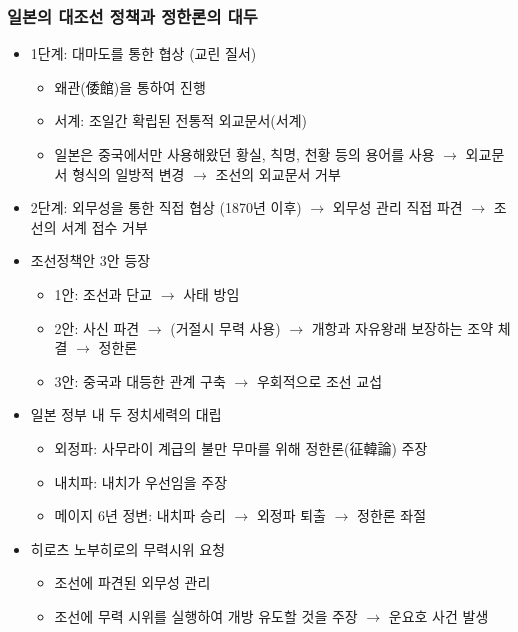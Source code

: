 \subsubsection*{일본의 대조선 정책과 정한론의 대두}
\begin{itemize}
    \item 1단계: 대마도를 통한 협상 (교린 질서)
    \begin{itemize}
        \item 왜관(倭館)을 통하여 진행
        \item 서계: 조일간 확립된 전통적 외교문서(서계)
        \item 일본은 중국에서만 사용해왔던 황실, 칙명, 천황 등의 용어를 사용 $\rightarrow$ 외교문서 형식의 일방적 변경 $\rightarrow$ 조선의 외교문서 거부
    \end{itemize}
    \item 2단계: 외무성을 통한 직접 협상 (1870년 이후) $\rightarrow$ 외무성 관리 직접 파견 $\rightarrow$ 조선의 서계 접수 거부
    \item 조선정책안 3안 등장
    \begin{itemize}
        \item 1안: 조선과 단교 $\rightarrow$ 사태 방임
        \item 2안: 사신 파견 $\rightarrow$ (거절시 무력 사용) $\rightarrow$ 개항과 자유왕래 보장하는 조약 체결 $\rightarrow$ 정한론
        \item 3안: 중국과 대등한 관계 구축 $\rightarrow$ 우회적으로 조선 교섭
    \end{itemize}
    \item 일본 정부 내 두 정치세력의 대립
    \begin{itemize}
        \item 외정파: 사무라이 계급의 불만 무마를 위해 정한론(征韓論) 주장
        \item 내치파: 내치가 우선임을 주장
        \item 메이지 6년 정변: 내치파 승리 $\rightarrow$ 외정파 퇴출 $\rightarrow$ 정한론 좌절
    \end{itemize}
    \item 히로츠 노부히로의 무력시위 요청
    \begin{itemize}
        \item 조선에 파견된 외무성 관리
        \item 조선에 무력 시위를 실행하여 개방 유도할 것을 주장 $\rightarrow$ 운요호 사건 발생
    \end{itemize}
\end{itemize}

